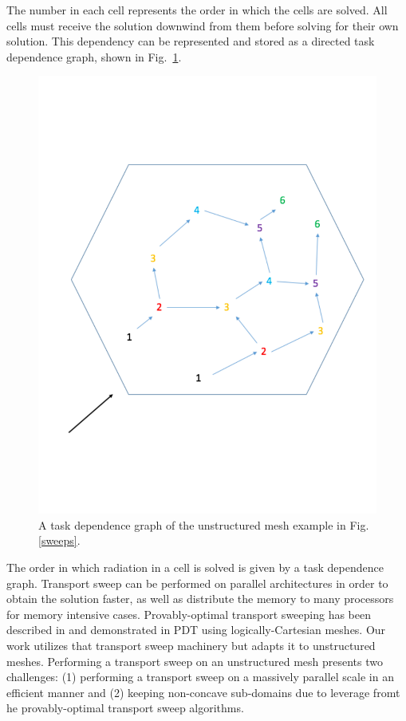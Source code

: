 \documentclass{anstrans}
\begin{document}
The number in each cell represents the order in which the cells are solved. All cells must receive the solution downwind from them before solving for their own solution. This dependency can be represented and stored as a directed task dependence graph, shown in Fig.~\ref{tdg}.

\begin{figure}
\centering
\includegraphics[scale = 0.4,trim = 0cm 3.5cm 0cm 3cm,clip]{figures/tdg.pdf}
\caption{A task dependence graph of the unstructured mesh example in Fig. \ref{sweeps}.}
\label{tdg}
\end{figure}

The order in which radiation in a cell is solved is given by a task dependence graph. Transport sweep can be performed on parallel architectures in order to obtain the solution faster, as well as distribute the memory to many processors for memory intensive cases. Provably-optimal transport sweeping has been described in \cite{mpadams2013} and demonstrated in PDT using logically-Cartesian meshes. Our work utilizes that transport sweep machinery but adapts it to unstructured meshes. Performing a transport sweep on an unstructured mesh presents two challenges: (1) performing a transport sweep on a massively parallel scale in an efficient manner and (2) keeping non-concave sub-domains due to leverage fromt he provably-optimal transport sweep algorithms. 
\end{document}
